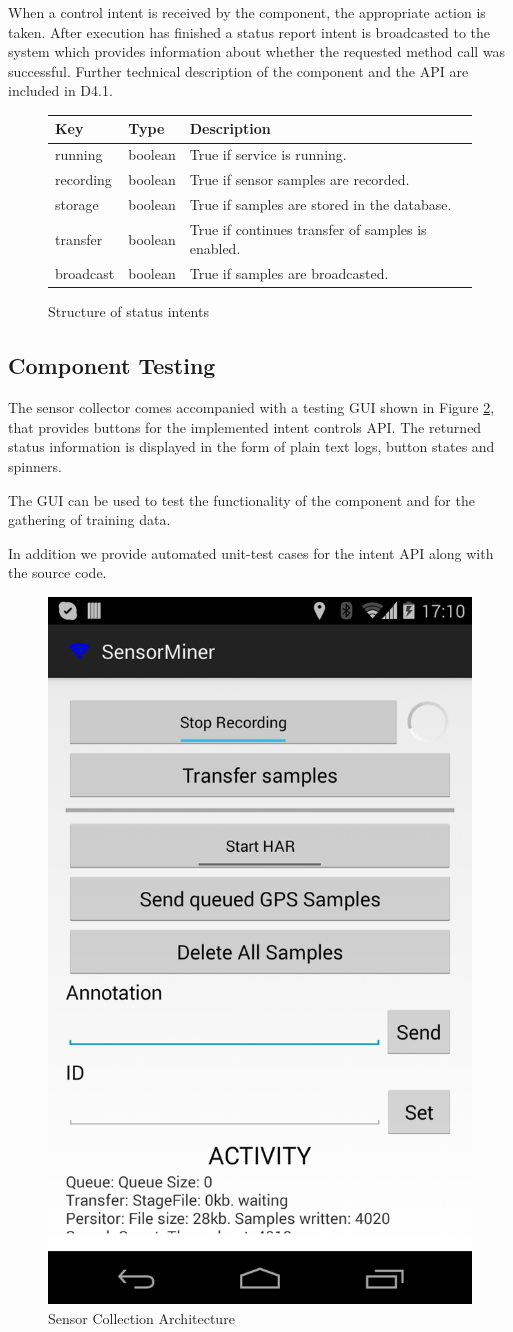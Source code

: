 When a control intent is received by the component, the appropriate
action is taken. After execution has finished a status report intent
is broadcasted to the system which provides information about whether
the requested method call was successful. Further technical
description of the component and the API are included in D4.1.

\begin{figure}[ht]
\centering
\begin{tabular}{|l|l|l|} \hline
   Key       & Type    & Description                                       \\ \hline
   running   & boolean & True if service is running.                       \\
   recording & boolean & True if sensor samples are recorded.              \\
   storage   & boolean & True if samples are stored in the database.       \\
   transfer  & boolean & True if continues transfer of samples is enabled. \\
   broadcast & boolean & True if samples are broadcasted.                  \\ \hline
\end{tabular}
\caption{Structure of status intents}
\label{tab:StatusIntent}
\end{figure}

\subsection*{Component Testing}

The sensor collector comes accompanied with a testing GUI shown in
Figure \ref{fig:sc_gui}, that provides buttons for the implemented
intent controls API. The returned status information is displayed in
the form of plain text logs, button states and spinners.

The GUI can be used to test the functionality of the component and for
the gathering of training data.

In addition we provide automated unit-test cases for the intent API
along with the source code.


\begin{figure}[h]
\centering
\includegraphics[width=0.3 \textwidth]{img/sc/sc_gui.png}
\caption{Sensor Collection Architecture}\label{fig:sc_gui}
\end{figure}

